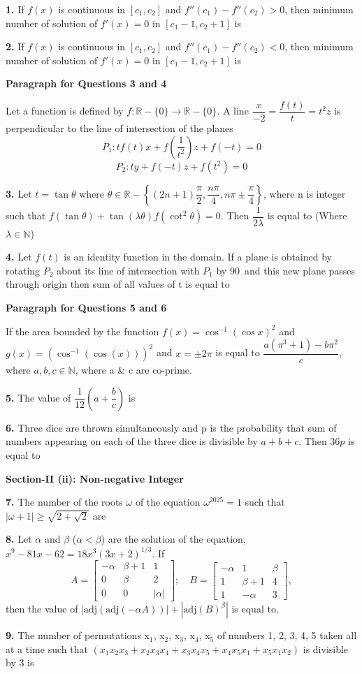 \documentclass[10pt,twocolumn]{extarticle}
\newcommand{\subsectionhdr}[1]{\par\vspace{3pt}\noindent\textbf{#1}\par\vspace{2pt}}
\begin{document}
\textbf{1.} If $f(x)$ is continuous in $[c_1,c_2]$ and $f''(c_1)-f''(c_2)>0$, then minimum number of solution of $f'(x)=0$ in $[c_1-1,c_2+1]$ is

\textbf{2.} If $f(x)$ is continuous in $[c_1,c_2]$ and $f''(c_1)-f''(c_2)<0$, then minimum number of solution of $f'(x)=0$ in $[c_1-1,c_2+1]$ is

\textbf{Paragraph for Questions 3 and 4}

Let a function is defined by $f:\mathbb R-\{0\}\to\mathbb R-\{0\}$. A line $\dfrac x{-2}=\dfrac{f(t)}t=t^2z$ is perpendicular to the line of intersection of the planes
$$P_1: tf(t)x+f\left(\dfrac1{t^2}\right)z+f(-t)=0$$
$$P_2: ty+f(-t)z+f(t^2)=0$$

\textbf{3.} Let $t=\tan\theta$ where $\theta\in\mathbb R-\left\{(2n+1)\dfrac\pi2,\dfrac{n\pi}4,n\pi\pm\dfrac\pi4\right\}$, where n is integer such that $f(\tan\theta)+\tan(\lambda\theta)f\left(\cot^2\theta\right)=0$. Then $\dfrac1{2\lambda}$ is equal to (Where $\lambda\in\mathbb N$)

\textbf{4.} Let $f(t)$ is an identity function in the domain. If a plane is obtained by rotating $P_2$ about its line of intersection with $P_1$ by 90\textdegree\ and this new plane passes through origin then sum of all values of t is equal to

\textbf{Paragraph for Questions 5 and 6}

If the area bounded by the function $f(x)=\cos^{-1}(\cos x)^2$ and $g(x)=\left(\cos^{-1}(\cos(x))\right)^2$ and $x=\pm2\pi$ is equal to $\dfrac{a(\pi^3+1)-b\pi^2}c$, where $a,b,c\in\mathbb N$, where a \& c are co-prime.

\textbf{5.} The value of $\dfrac1{12}\left(a+\dfrac bc\right)$ is

\textbf{6.} Three dice are thrown simultaneously and p is the probability that sum of numbers appearing on each of the three dice is divisible by $a+b+c$. Then $36p$ is equal to

\subsectionhdr{Section-II (ii): Non-negative Integer}

\textbf{7.} The number of the roots $\omega$ of the equation $\omega^{2025}=1$ such that $|\omega+1|\geq\sqrt{2+\sqrt2}$ are

\textbf{8.} Let $\alpha$ and $\beta$ ($\alpha<\beta$) are the solution of the equation, $x^9-81x-62=18x^3(3x+2)^{1/3}$. If
$$A=\begin{bmatrix}-\alpha&\beta+1&1\\0&\beta&2\\0&0&|\alpha|\end{bmatrix};\quad B=\begin{bmatrix}-\alpha&1&\beta\\1&\beta+1&4\\1&-\alpha&3\end{bmatrix},$$
then the value of $|\text{adj}(\text{adj}(-\alpha A))|+|\text{adj}(B)^\beta|$ is equal to.

\textbf{9.} The number of permutations x$_1$, x$_2$, x$_3$, x$_4$, x$_5$ of numbers 1, 2, 3, 4, 5 taken all at a time such that $(x_1x_2x_3+x_2x_3x_4+x_3x_4x_5+x_4x_5x_1+x_5x_1x_2)$ is divisible by 3 is
\end{document}
